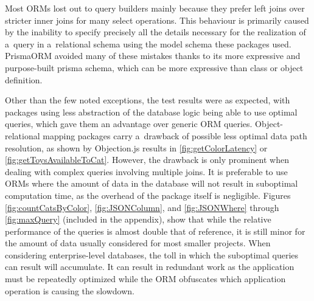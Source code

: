 Most ORMs lost out to query builders mainly because they prefer left joins over
stricter inner joins for many select operations. This behaviour is primarily
caused by the inability to specify precisely all the details necessary for the
realization of a~query in a~relational schema using the model schema these
packages used. PrismaORM avoided many of these mistakes thanks to its more
expressive and purpose-built prisma schema, which can be more expressive than
class or object definition.

Other than the few noted exceptions, the test results were as expected, with
packages using less abstraction of the database logic being able to use optimal
queries, which gave them an advantage over generic ORM queries.
Object-relational mapping packages carry a~drawback of possible less optimal
data path resolution, as shown by Objection.js results in
\autoref{fig:getColorLatency} or \autoref{fig:getToysAvailableToCat}. However,
the drawback is only prominent when dealing with complex queries involving
multiple joins. It is preferable to use ORMs where the amount of data in the
database will not result in suboptimal computation time, as the overhead of the
package itself is negligible. Figures \ref{fig:countCatsByColor},
\ref{fig:JSONColumn}, and \ref{fig:JSONWhere} through 
 \ref{fig:maxQuery} (included in the appendix), show that while the relative
performance of the queries is almost double that of reference, it is still minor
for the amount of data usually considered for most smaller projects. When
considering enterprise-level databases, the toll in which the suboptimal queries
can result will accumulate. It can result in redundant work as the application
must be repeatedly optimized while the ORM obfuscates which application
operation is causing the slowdown. 
